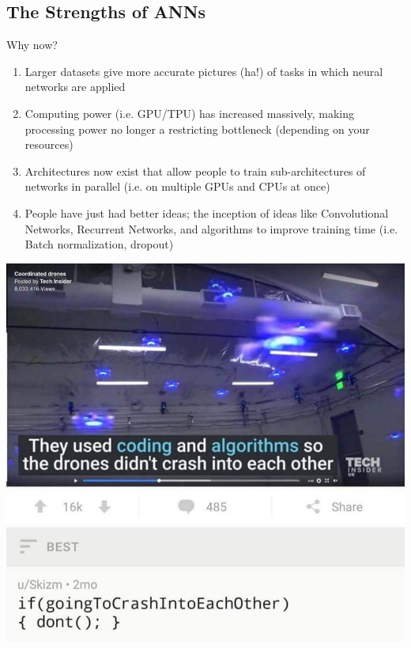 \documentclass{beamer}
\begin{document}
\subsection{The Strengths of ANNs}


\begin{frame}{Why now?}
\begin{enumerate}[1.]
    \item Larger datasets give more accurate pictures (ha!) of tasks in which neural networks are applied
    \item Computing power (i.e. GPU/TPU) has increased massively, making processing power no longer a restricting bottleneck (depending on your resources)
    \item Architectures now exist that allow people to train sub-architectures of networks in parallel (i.e. on multiple GPUs and CPUs at once)
    \item People have just had better ideas; the inception of ideas like Convolutional Networks, Recurrent Networks, and algorithms to improve training time (i.e. Batch normalization, dropout)
\end{enumerate}
\end{frame}


\begin{frame}
\includegraphics[width=\textwidth, height=\textheight]{images/image1.jpg}
\end{frame}
\end{document}
